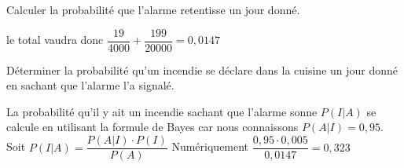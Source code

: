 \begin{exo}
\begin{subexo}{Calculer la probabilité que l'alarme retentisse un jour donné.}
\begin{center}
\begin{flushleft}
	    le total vaudra donc $\dfrac{19}{4000} + \dfrac{199}{20000} = 0,0147$
	\end{flushleft}
  \end{center}
  \end{subexo}
  \begin{subexo}{Déterminer la probabilité qu'un incendie se déclare dans la cuisine un jour donné en sachant que l'alarme l'a signalé.}
    \begin{flushleft}
      La probabilité qu'il y ait un incendie sachant que l'alarme sonne $P(I|A)$ se calcule en utilisant la formule de Bayes car nous connaissons $P(A|I) = 0,95$. Soit $P(I|A) = \dfrac{P(A|I)\cdot P(I)}{P(A)}$ Numériquement $\dfrac{0,95 \cdot 0,005}{0,0147} = 0,323$
    \end{flushleft}
  \end{subexo}
\end{exo}
